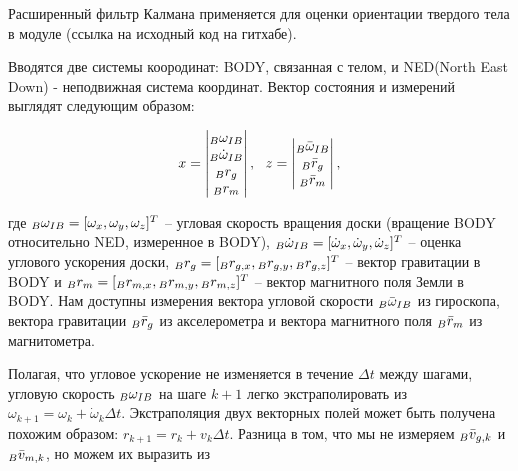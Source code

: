 \documentclass[12pt,a4paper]{article}
\newcounter{subsubsubsection}[subsubsection]
\begin{document}
Расширенный фильтр Калмана применяется для оценки ориентации твердого тела в модуле  (ссылка на исходный код на гитхабе).

Вводятся две системы коородинат: BODY, связанная с телом, и NED(North East Down) - неподвижная система координат.
Вектор состояния и измерений выглядят следующим образом:

\begin{equation*}
	x = 
	\begin{vmatrix}
		{\vphantom \omega}_B \omega_{IB} \\
		{\vphantom \omega}_B \dot{\omega}_{IB} \\
		{\vphantom r}_B r_g \\
		{\vphantom r}_B r_m \\
	\end{vmatrix}, \ \
	z = 
	\begin{vmatrix}
		{\vphantom \omega}_B \bar{\omega}_{IB} \\
		{\vphantom r}_B \bar{r}_g \\
		{\vphantom r}_B \bar{r}_m \\
	\end{vmatrix}, 
\end{equation*}

где ${\vphantom \omega}_B \omega_{IB} = [\omega_x, \omega_y, \omega_z]^T$ -- угловая скорость вращения доски (вращение BODY относительно NED, измеренное в BODY), ${\vphantom \omega}_B \dot{\omega}_{IB} = [\dot\omega_x, \dot\omega_y, \dot\omega_z]^T$ -- оценка углового ускорения доски, ${\vphantom r}_B r_g = [{\vphantom r}_B r_{g,x}, {\vphantom r}_B r_{g,y}, {\vphantom r}_B r_{g,z}]^T$ -- вектор гравитации в BODY и ${\vphantom r}_B r_m = [{\vphantom r}_B r_{m,x}, {\vphantom r}_B r_{m,y}, {\vphantom r}_B r_{m,z}]^T$ -- вектор магнитного поля Земли в BODY. Нам доступны измерения вектора угловой скорости ${\vphantom \omega}_B \bar{\omega}_{IB}$ из гироскопа, вектора гравитации ${\vphantom r}_B \bar{r}_g$ из акселерометра и вектора магнитного поля ${\vphantom r}_B \bar{r}_m $ из магнитометра.


Полагая, что угловое ускорение не изменяется в течение $\Delta t$ между шагами, угловую скорость ${\vphantom \omega}_B \omega_{IB}$ на шаге $k+1$ легко экстраполировать из $\omega_{k+1} = \omega_k + \dot\omega_k \Delta t$. Экстраполяция двух векторных полей может быть получена похожим образом: $r_{k+1} = r_k + v_k \Delta t$. Разница в том, что мы не измеряем ${\vphantom v}_B \bar{v}_{g,k}$ и ${\vphantom v}_B \bar{v}_{m,k}$, но можем их выразить из
\end{document}
